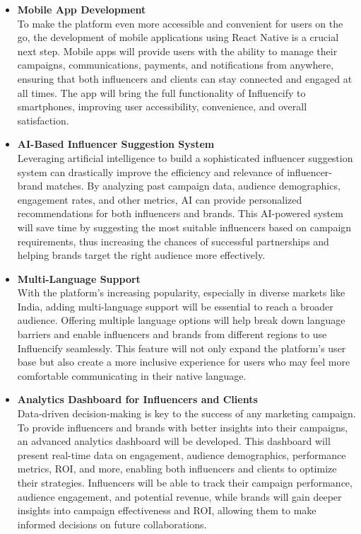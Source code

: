 \begin{justify}
\begin{itemize}
    \item \textbf{Mobile App Development} \\
    To make the platform even more accessible and convenient for users on the go, the development of mobile applications using React Native is a crucial next step. Mobile apps will provide users with the ability to manage their campaigns, communications, payments, and notifications from anywhere, ensuring that both influencers and clients can stay connected and engaged at all times. The app will bring the full functionality of Influencify to smartphones, improving user accessibility, convenience, and overall satisfaction.
    
    \item \textbf{AI-Based Influencer Suggestion System} \\
    Leveraging artificial intelligence to build a sophisticated influencer suggestion system can drastically improve the efficiency and relevance of influencer-brand matches. By analyzing past campaign data, audience demographics, engagement rates, and other metrics, AI can provide personalized recommendations for both influencers and brands. This AI-powered system will save time by suggesting the most suitable influencers based on campaign requirements, thus increasing the chances of successful partnerships and helping brands target the right audience more effectively.
    
    \item \textbf{Multi-Language Support} \\
    With the platform's increasing popularity, especially in diverse markets like India, adding multi-language support will be essential to reach a broader audience. Offering multiple language options will help break down language barriers and enable influencers and brands from different regions to use Influencify seamlessly. This feature will not only expand the platform's user base but also create a more inclusive experience for users who may feel more comfortable communicating in their native language.
    
    \item \textbf{Analytics Dashboard for Influencers and Clients} \\
    Data-driven decision-making is key to the success of any marketing campaign. To provide influencers and brands with better insights into their campaigns, an advanced analytics dashboard will be developed. This dashboard will present real-time data on engagement, audience demographics, performance metrics, ROI, and more, enabling both influencers and clients to optimize their strategies. Influencers will be able to track their campaign performance, audience engagement, and potential revenue, while brands will gain deeper insights into campaign effectiveness and ROI, allowing them to make informed decisions on future collaborations.
    

\end{itemize}
\end{justify}

